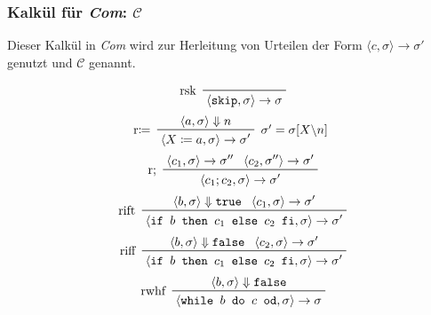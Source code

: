 									\subsubsection{Kalkül für \textit{Com}: $ \mathcal{C} $}
										Dieser Kalkül in \textit{Com} wird zur Herleitung von Urteilen der Form $ \langle c, \sigma \rangle \rightarrow \sigma' $ genutzt und $ \mathcal{C} $ genannt.

										\begin{multicols}{2}
											\begin{equation*}
												\prftree[l]
												{ rsk }
												{ \langle \texttt{skip}, \sigma \rangle \rightarrow \sigma }
											\end{equation*}
											\begin{equation*}
												\prftree[l, r]
												{ $ \sigma' = \sigma[X \backslash n] $ }
												{ r$ \coloneqq $ }
												{ \langle a, \sigma \rangle \Downarrow n }
												{ \langle X \coloneqq a, \sigma \rangle \rightarrow \sigma' }
											\end{equation*}
											\begin{equation*}
												\prftree[l]
												{ r; }
												{ \langle c _ 1, \sigma \rangle \rightarrow \sigma'' }
												{ \langle c _ 2, \sigma'' \rangle \rightarrow \sigma' }
												{ \langle c _ 1 ; c _ 2, \sigma \rangle \rightarrow \sigma' }
											\end{equation*}
											\begin{equation*}
												\prftree[l]
												{ rift }
												{ \langle b, \sigma \rangle \Downarrow \texttt{true} }
												{ \langle c _ 1, \sigma \rangle \rightarrow \sigma' }
												{ \langle \texttt{if } b \texttt{ then } c _ 1 \texttt{ else } c _ 2 \texttt{ fi}, \sigma \rangle \rightarrow \sigma' }
											\end{equation*}
											\begin{equation*}
												\prftree[l]
												{ riff }
												{ \langle b, \sigma \rangle \Downarrow \texttt{false} }
												{ \langle c _ 2, \sigma \rangle \rightarrow \sigma' }
												{ \langle \texttt{if } b \texttt{ then } c _ 1 \texttt{ else } c _ 2 \texttt{ fi}, \sigma \rangle \rightarrow \sigma' }
											\end{equation*}
											\begin{equation*}
												\prftree[l]
												{ rwhf }
												{ \langle b, \sigma \rangle \Downarrow \texttt{false} }
												{ \langle \texttt{while } b \texttt{ do } c \texttt{ od}, \sigma \rangle \rightarrow \sigma }
											\end{equation*}
										\end{multicols}
